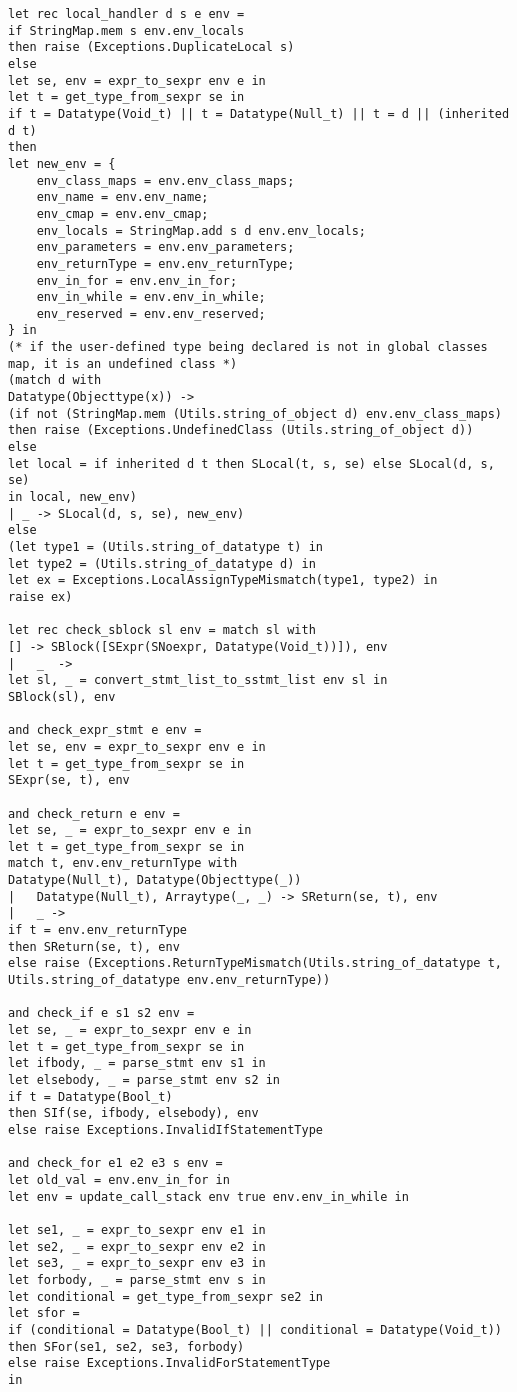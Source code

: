 \begin{verbatim}
let rec local_handler d s e env = 
if StringMap.mem s env.env_locals 
then raise (Exceptions.DuplicateLocal s)
else
let se, env = expr_to_sexpr env e in
let t = get_type_from_sexpr se in
if t = Datatype(Void_t) || t = Datatype(Null_t) || t = d || (inherited d t) 
then
let new_env = {
	env_class_maps = env.env_class_maps;
	env_name = env.env_name;
	env_cmap = env.env_cmap;
	env_locals = StringMap.add s d env.env_locals;
	env_parameters = env.env_parameters;
	env_returnType = env.env_returnType;
	env_in_for = env.env_in_for;
	env_in_while = env.env_in_while;
	env_reserved = env.env_reserved;
} in 
(* if the user-defined type being declared is not in global classes map, it is an undefined class *)
(match d with
Datatype(Objecttype(x)) -> 
(if not (StringMap.mem (Utils.string_of_object d) env.env_class_maps) 
then raise (Exceptions.UndefinedClass (Utils.string_of_object d)) 
else
let local = if inherited d t then SLocal(t, s, se) else SLocal(d, s, se)
in local, new_env)
| _ -> SLocal(d, s, se), new_env)
else 
(let type1 = (Utils.string_of_datatype t) in
let type2 = (Utils.string_of_datatype d) in
let ex = Exceptions.LocalAssignTypeMismatch(type1, type2) in
raise ex)

let rec check_sblock sl env = match sl with
[] -> SBlock([SExpr(SNoexpr, Datatype(Void_t))]), env
| 	_  -> 
let sl, _ = convert_stmt_list_to_sstmt_list env sl in
SBlock(sl), env

and check_expr_stmt e env = 
let se, env = expr_to_sexpr env e in
let t = get_type_from_sexpr se in 
SExpr(se, t), env

and check_return e env = 
let se, _ = expr_to_sexpr env e in
let t = get_type_from_sexpr se in
match t, env.env_returnType with 
Datatype(Null_t), Datatype(Objecttype(_)) 
| 	Datatype(Null_t), Arraytype(_, _) -> SReturn(se, t), env
| 	_ -> 
if t = env.env_returnType 
then SReturn(se, t), env
else raise (Exceptions.ReturnTypeMismatch(Utils.string_of_datatype t, Utils.string_of_datatype env.env_returnType))

and check_if e s1 s2 env = 
let se, _ = expr_to_sexpr env e in
let t = get_type_from_sexpr se in
let ifbody, _ = parse_stmt env s1 in
let elsebody, _ = parse_stmt env s2 in
if t = Datatype(Bool_t) 
then SIf(se, ifbody, elsebody), env
else raise Exceptions.InvalidIfStatementType

and check_for e1 e2 e3 s env = 
let old_val = env.env_in_for in
let env = update_call_stack env true env.env_in_while in

let se1, _ = expr_to_sexpr env e1 in
let se2, _ = expr_to_sexpr env e2 in
let se3, _ = expr_to_sexpr env e3 in
let forbody, _ = parse_stmt env s in
let conditional = get_type_from_sexpr se2 in
let sfor = 
if (conditional = Datatype(Bool_t) || conditional = Datatype(Void_t))
then SFor(se1, se2, se3, forbody)
else raise Exceptions.InvalidForStatementType
in


\end{verbatim}
